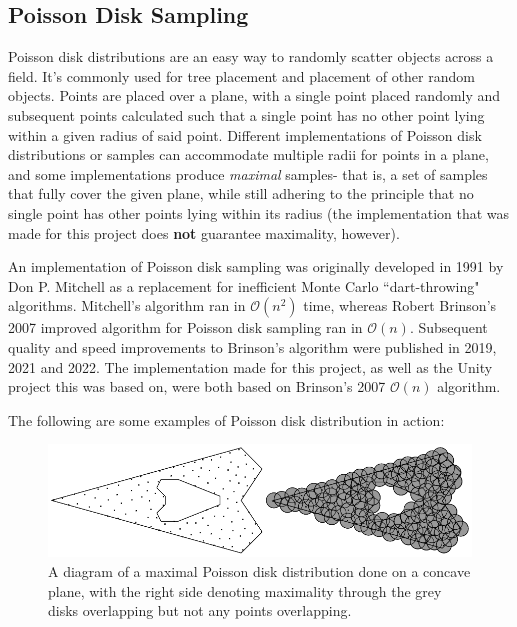 \subsection{Poisson Disk Sampling}

Poisson disk distributions are an easy way to randomly scatter objects across a field. It's commonly used for tree placement and placement of other random objects. Points are placed over a plane, with a single point placed randomly and subsequent points calculated such that a single point has no other point lying within a given radius of said point. Different implementations of Poisson disk distributions or samples can accommodate multiple radii for points in a plane, and some implementations produce \textit{maximal} samples- that is, a set of samples that fully cover the given plane, while still adhering to the principle that no single point has other points lying within its radius\cite{10.1145/1964921.1964944} (the implementation that was made for this project does \textbf{not} guarantee maximality, however).

An implementation of Poisson disk sampling was originally developed in 1991 by Don P. Mitchell\cite{10.1145/127719.122736} as a replacement for inefficient Monte Carlo ``dart-throwing" algorithms.\cite{pdshistory} Mitchell's algorithm ran in $\mathcal{O}(n^{2})$ time, whereas Robert Brinson's 2007 improved algorithm for Poisson disk sampling\cite{10.1145/1278780.1278807} ran in $\mathcal{O}(n)$. Subsequent quality and speed improvements to Brinson's algorithm were published in 2019\cite{pdsimprovementroberts}, 2021\cite{pdshistory} and 2022\cite{pdsimprovementrus}. The implementation made for this project, as well as the Unity project this was based on, were both based on Brinson's 2007 $\mathcal{O}(n)$ algorithm.\cite{seblaguetuteGH}\cite{seblaguetuteYT}

The following are some examples of Poisson disk distribution in action:

\begin{figure}[H]
    \centering
    \includegraphics[width=\textwidth]{Images/maximalpoissonsample.png}
    \caption{A diagram of a maximal Poisson disk distribution done on a concave plane, with the right side denoting maximality through the grey disks overlapping but not any points overlapping.\cite{10.1145/1964921.1964944}}
    \label{fig:maximalpoisson}
\end{figure}

